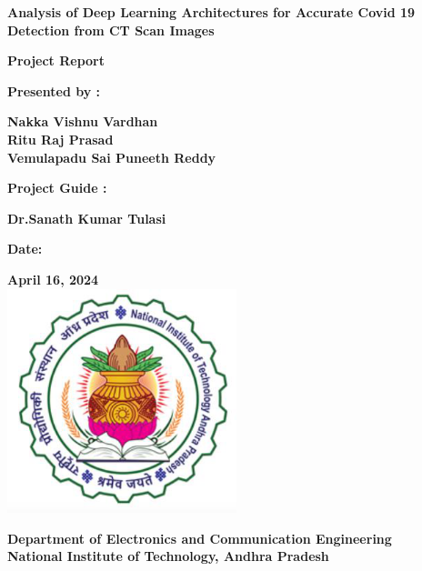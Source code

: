 \documentclass[12pt, a4paper]{report}
\begin{document}
\setlength{\baselineskip}{0.5cm}

\begin{titlepage}
    \centering
    
    \Huge\textbf{Analysis of Deep Learning Architectures for Accurate Covid 19 Detection from CT Scan Images}
    
    \vspace{1cm}
    
    \Large\textbf{Project Report}
    
    \vspace{1cm}
    
    \large\textbf{Presented by :}
    
    \textbf{Nakka Vishnu Vardhan}\\
    \textbf{Ritu Raj Prasad}\\
    \textbf{Vemulapadu Sai Puneeth Reddy}
    \vspace{1cm}
    
    \large\textbf{Project Guide :}
    
    \textbf{Dr.Sanath Kumar Tulasi}
    
    \vspace{1cm}
    
    \textbf{Date:}
    
    \textbf{April 16, 2024}\
    \\
    \vspace{1cm}
    \includegraphics[width=0.5\textwidth]{report images/image1.png}

    \vspace{.4cm}
    
    \large\textbf{Department of Electronics and Communication Engineering}\\
      \vspace{.4cm}
    \textbf{National Institute of Technology, Andhra Pradesh}
    
\end{titlepage}
\end{document}
